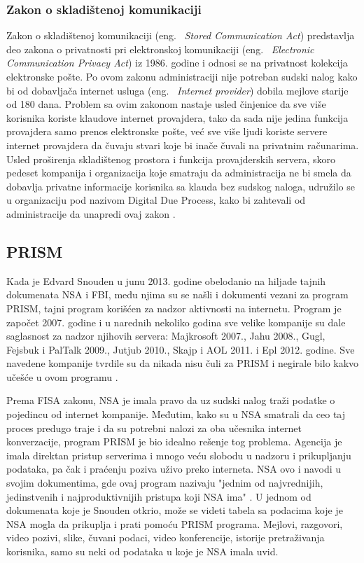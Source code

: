 \documentclass[a4paper]{article}
\begin{document}
\subsubsection{Zakon o skladištenoj komunikaciji}
Zakon o skladištenoj komunikaciji (eng. ~{\em Stored Communication Act}) predstavlja deo zakona o privatnosti pri elektronskoj komunikaciji (eng. ~{\em Electronic Communication Privacy Act}) iz 1986. godine i odnosi se na privatnost kolekcija elektronske pošte. Po ovom zakonu administraciji nije potreban sudski nalog kako bi od dobavljača internet usluga (eng. ~{\em Internet provider})  dobila mejlove starije od 180 dana. Problem sa ovim zakonom nastaje usled činjenice da sve više korisnika koriste klaudove internet provajdera, tako da sada nije jedina funkcija provajdera samo prenos elektronske pošte, već sve više ljudi koriste servere internet provajdera da čuvaju stvari koje bi inače čuvali na privatnim računarima. Usled proširenja skladištenog prostora i funkcija provajderskih servera, skoro pedeset kompanija i organizacija koje smatraju da administracija ne bi smela da dobavlja privatne informacije korisnika sa klauda bez sudskog naloga, udružilo se u organizaciju pod nazivom Digital Due Process, kako bi zahtevali od administracije da unapredi ovaj zakon \cite{ddp}.


\subsection{PRISM}
\label{subsec:prism}
Kada je Edvard Snouden u junu 2013. godine obelodanio na hiljade tajnih dokumenata NSA i FBI, među njima su se našli i dokumenti vezani za program PRISM, tajni program korišćen za nadzor aktivnosti na internetu. Program je započet 2007. godine i u narednih nekoliko godina sve velike kompanije su dale saglasnost za nadzor njihovih servera: Majkrosoft 2007., Jahu 2008.,  Gugl, Fejsbuk i PalTalk 2009.,  Jutjub 2010., Skajp i AOL 2011. i Epl 2012. godine. Sve navedene kompanije tvrdile su da nikada nisu čuli za PRISM i negirale bilo kakvo učešće u ovom programu \cite{prism}. 
\par Prema FISA zakonu, NSA je imala pravo da uz sudski nalog traži podatke o pojedincu od internet kompanije. Međutim, kako su u NSA smatrali da ceo taj proces predugo traje i da su potrebni nalozi za oba učesnika internet konverzacije, program PRISM je bio idealno rešenje tog problema. Agencija je imala direktan pristup serverima i  mnogo veću slobodu u nadzoru i prikupljanju podataka, pa čak i praćenju poziva uživo preko interneta. NSA ovo i navodi u svojim dokumentima, gde ovaj program nazivaju "jednim od najvrednijih, jedinstvenih i najproduktivnijih pristupa koji NSA ima" \cite{prism}. U jednom od dokumenata koje je Snouden otkrio, može se videti tabela sa podacima koje je NSA mogla da prikuplja i prati pomoću PRISM programa. Mejlovi, razgovori, video pozivi, slike, čuvani podaci, video konferencije, istorije pretraživanja korisnika, samo su neki od podataka u koje je NSA imala uvid.
\end{document}
